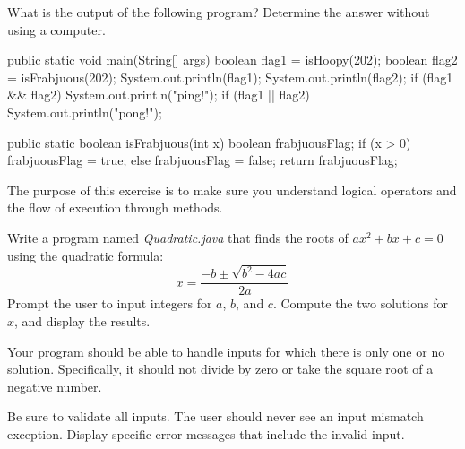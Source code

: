 \begin{exercise}  %

What is the output of the following program?
Determine the answer without using a computer.

\begin{code}
public static void main(String[] args) {
    boolean flag1 = isHoopy(202);
    boolean flag2 = isFrabjuous(202);
    System.out.println(flag1);
    System.out.println(flag2);
    if (flag1 && flag2) {
        System.out.println("ping!");
    }
    if (flag1 || flag2) {
        System.out.println("pong!");
    }
}
\end{code}


\begin{code}
public static boolean isFrabjuous(int x) {
    boolean frabjuousFlag;
    if (x > 0) {
        frabjuousFlag = true;
    } else {
        frabjuousFlag = false;
    }
    return frabjuousFlag;
}
\end{code}

The purpose of this exercise is to make sure you understand logical operators and the flow of execution through methods.

\end{exercise}


\begin{exercise}  %

Write a program named {\it Quadratic.java} that finds the roots of $ax^2 + bx + c = 0$ using the quadratic formula:
%
\[ x = \frac{-b \pm \sqrt{b^2 - 4ac}}{2a} \]
%
Prompt the user to input integers for $a$, $b$, and $c$.
Compute the two solutions for $x$, and display the results.

Your program should be able to handle inputs for which there is only one or no solution.
Specifically, it should not divide by zero or take the square root of a negative number.

Be sure to validate all inputs.
The user should never see an input mismatch exception.
Display specific error messages that include the invalid input.

\end{exercise}


